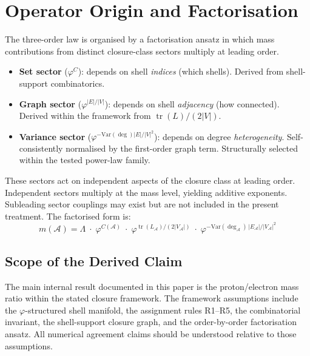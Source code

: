 \documentclass[12pt]{article}
\newcommand{\Acal}{\mathcal{A}}
\newcommand{\phig}{\varphi}
\begin{document}
\section{Operator Origin and Factorisation}\label{sec:operator}

The three-order law is organised by a factorisation ansatz in which mass contributions from distinct closure-class sectors multiply at leading order.

\begin{itemize}
    \item \textbf{Set sector} ($\phig^C$): depends on shell \textit{indices} (which shells). Derived from shell-support combinatorics.
    \item \textbf{Graph sector} ($\phig^{|E|/|V|}$): depends on shell \textit{adjacency} (how connected). Derived within the framework from $\operatorname{tr}(L)/(2|V|)$.
    \item \textbf{Variance sector} ($\phig^{-\mathrm{Var}(\deg)|E|/|V|^2}$): depends on degree \textit{heterogeneity}. Self-consistently normalised by the first-order graph term. Structurally selected within the tested power-law family.
\end{itemize}

These sectors act on independent aspects of the closure class at leading order. Independent sectors multiply at the mass level, yielding additive exponents. Subleading sector couplings may exist but are not included in the present treatment. The factorised form is:
\begin{equation}
    m(\Acal) = \Lambda \;\cdot\; \phig^{C(\Acal)} \;\cdot\; \phig^{\operatorname{tr}(L_\Acal)/(2|V_\Acal|)} \;\cdot\; \phig^{-\mathrm{Var}(\deg_\Acal)\,|E_\Acal|/|V_\Acal|^2}
\end{equation}

\subsection*{Scope of the Derived Claim}

The main internal result documented in this paper is the proton/electron mass ratio within the stated closure framework. The framework assumptions include the $\phig$-structured shell manifold, the assignment rules R1--R5, the combinatorial invariant, the shell-support closure graph, and the order-by-order factorisation ansatz. All numerical agreement claims should be understood relative to those assumptions.
\end{document}
